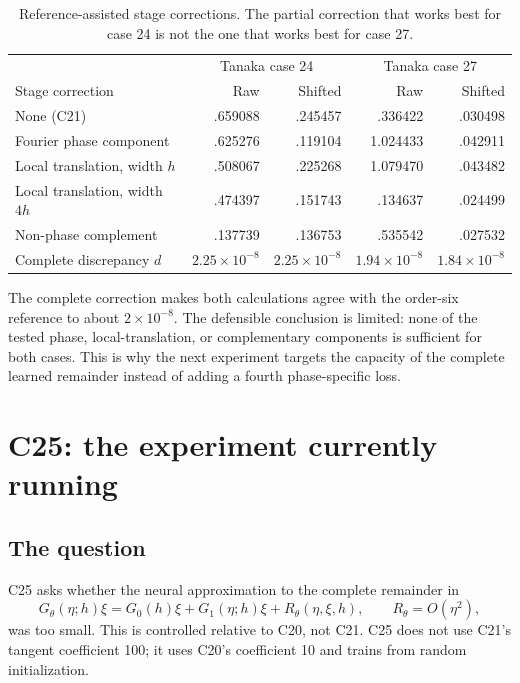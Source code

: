\documentclass[11pt]{article}
\begin{document}
\begin{table}[htbp]
\centering
\small
\begin{tabular}{lrrrr}
\toprule
& \multicolumn{2}{c}{Tanaka case 24} & \multicolumn{2}{c}{Tanaka case 27} \\
Stage correction & Raw & Shifted & Raw & Shifted \\
\midrule
None (C21) & .659088 & .245457 & .336422 & .030498 \\
Fourier phase component & .625276 & .119104 & 1.024433 & .042911 \\
Local translation, width $h$ & .508067 & .225268 & 1.079470 & .043482 \\
Local translation, width $4h$ & .474397 & .151743 & .134637 & .024499 \\
Non-phase complement & .137739 & .136753 & .535542 & .027532 \\
Complete discrepancy $d$ & $2.25\times10^{-8}$ & $2.25\times10^{-8}$
& $1.94\times10^{-8}$ & $1.84\times10^{-8}$ \\
\bottomrule
\end{tabular}
\caption{Reference-assisted stage corrections.  The partial correction that
works best for case 24 is not the one that works best for case 27.}
\label{tab:corrections}
\end{table}

The complete correction makes both calculations agree with the order-six
reference to about $2\times10^{-8}$.  The defensible conclusion is limited:
none of the tested phase, local-translation, or complementary components is
sufficient for both cases.  This is why the next experiment targets the
capacity of the complete learned remainder instead of adding a fourth
phase-specific loss.

\FloatBarrier

\section{C25: the experiment currently running}

\subsection{The question}

C25 asks whether the neural approximation to the complete remainder in
\begin{equation}
  G_\theta(\eta;h)\xi
  =G_0(h)\xi+G_1(\eta;h)\xi+R_\theta(\eta,\xi,h),
  \qquad R_\theta=O(\eta^2),
  \label{eq:c25-model}
\end{equation}
was too small.  This is controlled relative to C20, not C21.  C25 does not use
C21's tangent coefficient 100; it uses C20's coefficient 10 and trains from
random initialization.
\end{document}
